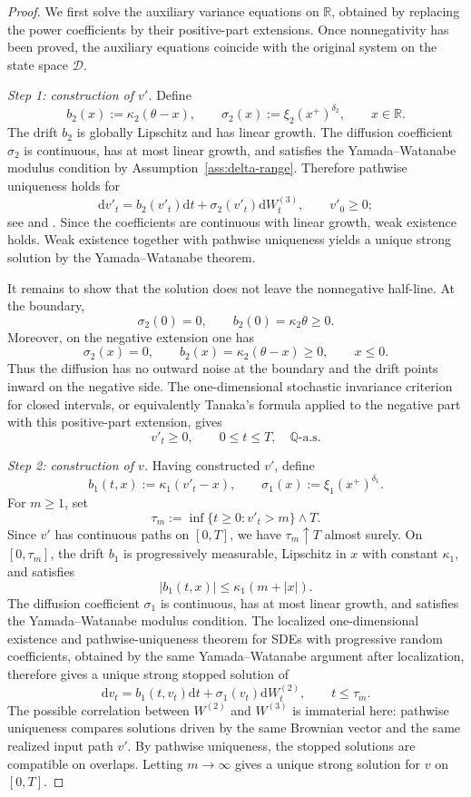 \documentclass[pdflatex,sn-mathphys-num]{sn-jnl}
\theoremstyle{thmstyleone}%
\theoremstyle{thmstylethree}%
\theoremstyle{thmstyletwo}%
\newcommand{\dd}{\mathrm d}
\newcommand{\Q}{\mathbb Q}
\newcommand{\R}{\mathbb R}
\begin{document}
\begin{proof}
We first solve the auxiliary variance equations on $\R$, obtained by replacing
the power coefficients by their positive-part extensions. Once nonnegativity has
been proved, the auxiliary equations coincide with the original system on the
state space $\mathcal D$.

\emph{Step 1: construction of $v'$.}
Define
\[
b_2(x):=\kappa_2(\theta-x),\qquad
\sigma_2(x):=\xi_2(x^+)^{\delta_2},\qquad x\in\R.
\]
The drift $b_2$ is globally Lipschitz and has linear growth. The diffusion
coefficient $\sigma_2$ is continuous, has at most linear growth, and satisfies
the Yamada--Watanabe modulus condition by Assumption~\ref{ass:delta-range}.
Therefore pathwise uniqueness holds for
\[
\dd v'_t=b_2(v'_t)\dd t+\sigma_2(v'_t)\dd W^{(3)}_t,
\qquad v'_0\ge0;
\]
see \cite{yamada1971uniqueness} and \cite[Ch.~5]{karatzas1991brownian}. Since
the coefficients are continuous with linear growth, weak existence holds. Weak
existence together with pathwise uniqueness yields a unique strong solution by
the Yamada--Watanabe theorem.

It remains to show that the solution does not leave the nonnegative half-line.
At the boundary,
\[
\sigma_2(0)=0,\qquad b_2(0)=\kappa_2\theta\ge0.
\]
Moreover, on the negative extension one has
\[
\sigma_2(x)=0,\qquad b_2(x)=\kappa_2(\theta-x)\ge0,\qquad x\le0.
\]
Thus the diffusion has no outward noise at the boundary and the drift points
inward on the negative side. The one-dimensional stochastic invariance
criterion for closed intervals, or equivalently Tanaka's formula applied to the
negative part with this positive-part extension, gives
\[
v'_t\ge0,\qquad 0\le t\le T,\quad \Q\text{-a.s.}
\]

\emph{Step 2: construction of $v$.}
Having constructed $v'$, define
\[
b_1(t,x):=\kappa_1(v'_t-x),\qquad
\sigma_1(x):=\xi_1(x^+)^{\delta_1}.
\]
For $m\ge1$, set
\[
\tau_m:=\inf\{t\ge0:v'_t>m\}\wedge T.
\]
Since $v'$ has continuous paths on $[0,T]$, we have $\tau_m\uparrow T$ almost
surely. On $[0,\tau_m]$, the drift $b_1$ is progressively measurable,
Lipschitz in $x$ with constant $\kappa_1$, and satisfies
\[
|b_1(t,x)|\le\kappa_1(m+|x|).
\]
The diffusion coefficient $\sigma_1$ is continuous, has at most linear growth,
and satisfies the Yamada--Watanabe modulus condition. The localized
one-dimensional existence and pathwise-uniqueness theorem for SDEs with
progressive random coefficients, obtained by the same Yamada--Watanabe argument
after localization, therefore gives a unique strong stopped solution of
\[
\dd v_t=b_1(t,v_t)\dd t+\sigma_1(v_t)\dd W^{(2)}_t,
\qquad t\le\tau_m.
\]
The possible correlation between $W^{(2)}$ and $W^{(3)}$ is immaterial here:
pathwise uniqueness compares solutions driven by the same Brownian vector and
the same realized input path $v'$. By pathwise uniqueness, the stopped solutions
are compatible on overlaps. Letting $m\to\infty$ gives a unique strong solution
for $v$ on $[0,T]$.


\end{proof}
\end{document}
